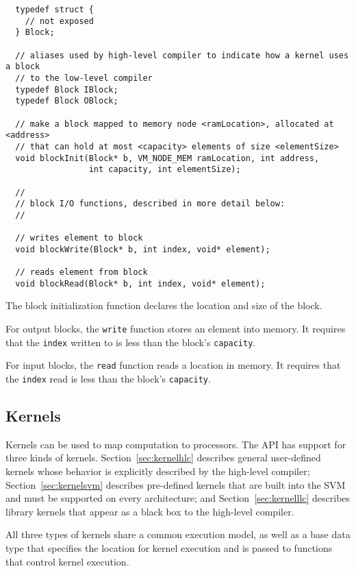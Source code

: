 {\small
\begin{verbatim}
  typedef struct {
    // not exposed
  } Block;

  // aliases used by high-level compiler to indicate how a kernel uses a block
  // to the low-level compiler
  typedef Block IBlock;
  typedef Block OBlock;

  // make a block mapped to memory node <ramLocation>, allocated at <address> 
  // that can hold at most <capacity> elements of size <elementSize>
  void blockInit(Block* b, VM_NODE_MEM ramLocation, int address, 
                 int capacity, int elementSize);

  //
  // block I/O functions, described in more detail below:
  //

  // writes element to block
  void blockWrite(Block* b, int index, void* element);

  // reads element from block
  void blockRead(Block* b, int index, void* element); \end{verbatim}}

 The block initialization function
declares the location and size of the block.


 For output blocks, the {\tt write} function stores
an element into memory.  It requires that the {\tt index} written to
is less than the block's {\tt capacity}.

 For input blocks, the {\tt read} function reads a
location in memory.  It requires that the {\tt index} read is less
than the block's {\tt capacity}.

\subsection{Kernels}
\label{sec:kernel}

Kernels can be used to map computation to processors.  The API has
support for three kinds of kernels. Section~\ref{sec:kernelhlc}
describes general user-defined kernels whose behavior is explicitly
described by the high-level compiler; Section~\ref{sec:kernelsvm}
describes pre-defined kernels that are built into the SVM and must be
supported on every architecture; and Section~\ref{sec:kernelllc}
describes library kernels that appear as a black box to the high-level
compiler.

All three types of kernels share a common execution model, as well as
a base data type that specifies the location for kernel execution and
is passed to functions that control kernel execution.

